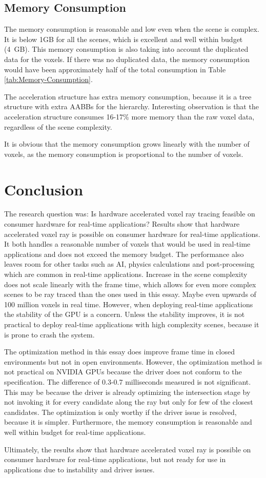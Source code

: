 \documentclass[12pt]{article}
\begin{document}
\subsection{Memory Consumption}

The memory consumption is reasonable and low even when the scene is complex.
It is below 1GB for all the scenes, which is excellent and well within budget (4 GB).
This memory consumption is also taking into account the duplicated data for the voxels.
If there was no duplicated data, the memory consumption would have been approximately half of the total consumption in Table \ref{tab:Memory-Consumption}.


The acceleration structure has extra memory consumption, because it is a tree structure
with extra AABBs for the hierarchy. Interesting observation is that the
acceleration structure consumes 16-17\% more memory than the raw voxel data,
regardless of the scene complexity.

It is obvious that the memory consumption grows linearly with the number of voxels,
as the memory consumption is proportional to the number of voxels.

\section{Conclusion}


The research question was: Is hardware accelerated voxel ray tracing feasible on consumer hardware for real-time applications?
Results show that hardware accelerated voxel ray is possible on consumer hardware for real-time applications.
It both handles a reasonable number of voxels that would be used in real-time applications and does not exceed the memory budget.
The performance also leaves room for other tasks such as AI, physics calculations and post-processing which are common in real-time applications.
Increase in the scene complexity does not scale linearly with the frame time, which allows for even more complex scenes
to be ray traced than the ones used in this essay. Maybe even upwards of 100 million voxels in real time.
However, when deploying real-time applications the stability of the GPU is a concern.
Unless the stability improves, it is not practical to deploy real-time applications with high complexity scenes,
because it is prone to crash the system.

The optimization method in this essay does improve frame time in closed environments but not in open environments.
However, the optimization method is not practical on NVIDIA GPUs because the driver does not conform to the specification.
The difference of 0.3-0.7 milliseconds measured is not significant. This may be because the driver is already optimizing the intersection stage by not invoking it for every candidate
along the ray but only for few of the closest candidates. The optimization is only worthy if the driver issue is resolved, because it is simpler.
Furthermore, the memory consumption is reasonable and well within budget for real-time applications.

Ultimately, the results show that hardware accelerated voxel ray is possible on consumer hardware for real-time applications,
but not ready for use in applications due to instability and driver issues.

\printbibliography
\end{document}
